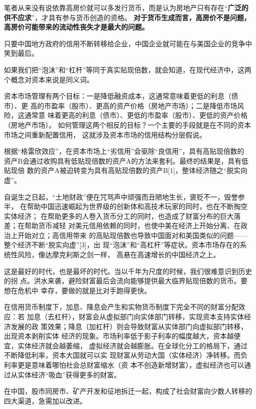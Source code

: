笔者从来没有说依靠高房价就可以多发行货币，而是认为房地产只有存在“\textbf{广泛的供不应求}”，才具有参与货币创造的资格。
\textbf{对于货币生成而言，高房价不是问题，高房价可能带来的流动性丧失才是最大的问题。}

只要中国地方政府的信用不断转移给企业，中国企业就可能在与美国企业的竞争中笑到最后。

如果我们把“泡沫”和“杠杆”等同于真实贴现倍数，就会知道，在现代经济中，这两个概念对资本来说是同义词。

资本市场管理有两个目标：一是降低融资成本，这通常意味着更低的利息（债市）、更
高的市盈率（股市）、更高的资产价格（房地产市场）；二是降低市场风险，这通常意
味着更高的利息（债市）、更低的市盈率（股市）、更低的资产价格（房地产市场）。
如何管理这两个相反的目标？一个主要的手段就是在不同的资本市场之间重新配置信用，
这就涉及资本市场的信用结构分层假说。

根据“格雷欣效应”，在资本市场上“劣信用”会驱除“良信用”，具有高贴现倍数的
资产B会通过收购具有低贴现倍数的资产A的方法来套利。最终的结果是，具有低贴现倍
数的资产A被迫转变为具有高贴现倍数的资产B[1]，整体经济随之“脱实向虚”。

自诞生之日起，“土地财政”便在咒骂声中顽强而丑陋地生长，褒贬不一，毁誉参半，
在帮助中国迅速崛起为世界级的创新体和高技术玩家的同时，也在不断掏空实体经济；
在帮助更多的人卷入货币分工的同时，也造成了财富分布的巨大落差；在帮助货币减轻
对美元信用依赖的同时，也使中美在经济上开始分离、在政治上开始对立；高信用带来
的高贴现倍数也导致中国面对和美国类似的问题——整个经济不断“脱实向虚”[3]，出
现“泡沫”和“高杠杆”等症状。资本市场存在的系统性风险，像达摩克利斯之剑一样，
高悬在高速增长的中国经济之上。

这是最好的时代，也是最坏的时代。当以千年为尺度的时候，我们很难意识到历史的拐
点。洪水来袭，避险财富最后会流向能够提供最大临界贴现倍数的货币。要想在危机中
幸存，要做的就是比对手跑得更快。

在信用货币制度下，加息、降息会产生和实物货币制度下完全不同的财富分配效应：若
加息（去杠杆），财富会从虚拟部门向实体部门转移，实现资本支持实体经济发展的政
策效果；降息（加杠杆）则会导致财富从实体部门向虚拟部门转移，出现资本剥削实体
经济的现象。市场利率低于影子利率的幅度越大，资本越便宜，实体经济就会越萎缩，
虚拟经济就会越膨胀。在全球化分工的格局下，通过不断降低利率，资本大国就可以实
现财富从劳动大国（实体经济）净转移。而负利率更是意味着哪怕社会总财富缩水（资
本不创造新增财富），虚拟经济也可以通过从实体经济“吸血”获得更多的财富。

在中国，股市同房市、矿产开发和征地拆迁一起，构成了社会财富向少数人转移的四大渠道，急需加以改进。

